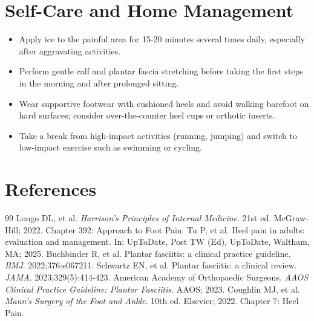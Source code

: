 \section*{Self-Care and Home Management}
\begin{itemize}
  \item Apply ice to the painful area for 15-20 minutes several times daily, especially after aggravating activities.
  \item Perform gentle calf and plantar fascia stretching before taking the first steps in the morning and after prolonged sitting.
  \item Wear supportive footwear with cushioned heels and avoid walking barefoot on hard surfaces; consider over-the-counter heel cups or orthotic inserts.
  \item Take a break from high-impact activities (running, jumping) and switch to low-impact exercise such as swimming or cycling.
\end{itemize}

\section*{References}

\begin{thebibliography}{99}
 Longo DL, et al. \emph{Harrison's Principles of Internal Medicine}. 21st ed. McGraw-Hill; 2022. Chapter 392: Approach to Foot Pain.
 Tu P, et al. Heel pain in adults: evaluation and management. In: UpToDate, Post TW (Ed), UpToDate, Waltham, MA; 2025.
 Buchbinder R, et al. Plantar fasciitis: a clinical practice guideline. \emph{BMJ}. 2022;376:e067211.
 Schwartz EN, et al. Plantar fasciitis: a clinical review. \emph{JAMA}. 2023;329(5):414-423.
 American Academy of Orthopaedic Surgeons. \emph{AAOS Clinical Practice Guideline: Plantar Fasciitis}. AAOS; 2023.
 Coughlin MJ, et al. \emph{Mann's Surgery of the Foot and Ankle}. 10th ed. Elsevier; 2022. Chapter 7: Heel Pain.
\end{thebibliography}
